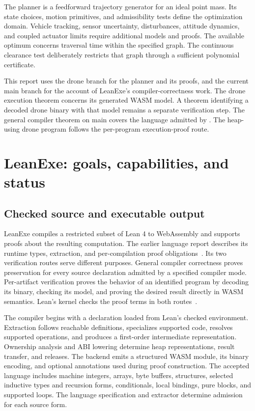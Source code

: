 \documentclass[11pt]{article}
\begin{document}
The planner is a feedforward trajectory generator for an ideal point mass.  Its state choices, motion primitives, and admissibility tests define the optimization domain.  Vehicle tracking, sensor uncertainty, disturbances, attitude dynamics, and coupled actuator limits require additional models and proofs.  The available optimum concerns traversal time within the specified graph.  The continuous clearance test deliberately restricts that graph through a sufficient polynomial certificate.

This report uses the drone branch for the planner and its proofs, and the current main branch for the account of LeanExe's compiler-correctness work.  The drone execution theorem concerns its generated WASM model.  A theorem identifying a decoded drone binary with that model remains a separate verification step.  The general compiler theorem on main covers the language admitted by .  The heap-using drone program follows the per-program execution-proof route.

\section{LeanExe: goals, capabilities, and status}
\label{sec:leanexe}

\subsection{Checked source and executable output}

LeanExe compiles a restricted subset of Lean 4 to WebAssembly and supports proofs about the resulting computation.  The earlier language report describes its runtime types, extraction, and per-compilation proof obligations~\cite{leanexe-background}.  Its two verification routes serve different purposes.  General compiler correctness proves preservation for every source declaration admitted by a specified compiler mode.  Per-artifact verification proves the behavior of an identified program by decoding its binary, checking its model, and proving the desired result directly in WASM semantics.  Lean's kernel checks the proof terms in both routes~\cite{lean}.

The compiler begins with a declaration loaded from Lean's checked environment.  Extraction follows reachable definitions, specializes supported code, resolves supported operations, and produces a first-order intermediate representation.  Ownership analysis and ABI lowering determine heap representations, result transfer, and releases.  The backend emits a structured WASM module, its binary encoding, and optional annotations used during proof construction.  The accepted language includes machine integers, arrays, byte buffers, structures, selected inductive types and recursion forms, conditionals, local bindings, pure  blocks, and supported loops.  The language specification and extractor determine admission for each source form.
\end{document}

